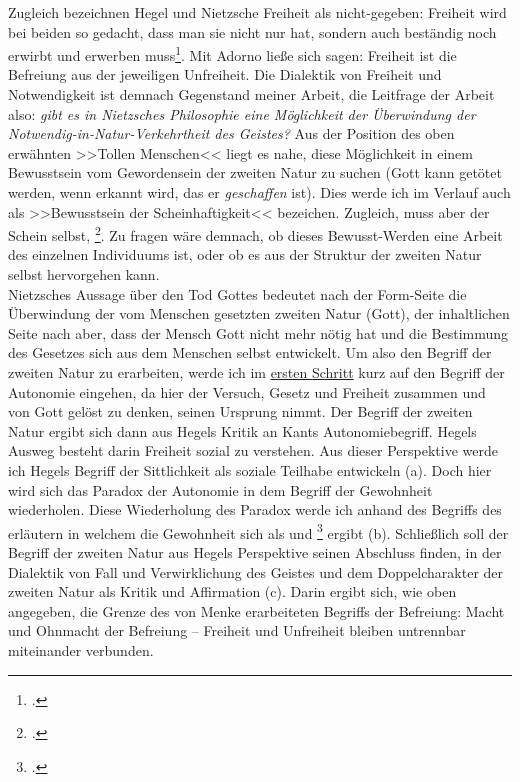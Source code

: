 \documentclass[12pt, a4paper, openany]{report}
\begin{document}
Zugleich bezeichnen Hegel und Nietzsche Freiheit als nicht-gegeben: 
Freiheit wird bei beiden so gedacht, dass man sie \glqq nicht nur hat, sondern auch beständig  noch erwirbt und erwerben muss\grqq\footcite[][636]{nietzsche_morgenrote_1999}. 
Mit Adorno ließe sich sagen: Freiheit ist die Befreiung aus der jeweiligen Unfreiheit.
Die Dialektik von Freiheit und Notwendigkeit ist demnach Gegenstand meiner Arbeit, 
die Leitfrage der Arbeit also: \textit{gibt es in Nietzsches Philosophie eine Möglichkeit der Überwindung der Notwendig-in-Natur-Verkehrtheit des Geistes?}
Aus der Position des oben erwähnten >>Tollen Menschen<< liegt es nahe, diese Möglichkeit in einem Bewusstsein vom Gewordensein der zweiten Natur zu suchen (Gott kann getötet werden, wenn erkannt wird, das er \emph{geschaffen} ist). 
Dies werde ich im Verlauf auch als >>Bewusstsein der Scheinhaftigkeit<< bezeichen.
Zugleich, muss aber der Schein selbst, \footcite[][417.]{nietzsche_morgenrote_1999}.
Zu fragen wäre demnach, ob dieses Bewusst-Werden eine Arbeit des einzelnen Individuums ist, oder ob es aus der Struktur der zweiten Natur selbst hervorgehen kann.\\

Nietzsches Aussage über den Tod Gottes bedeutet nach der Form-Seite die Überwindung der vom Menschen gesetzten zweiten Natur (Gott), der inhaltlichen Seite nach aber, dass der Mensch Gott nicht mehr nötig hat und die Bestimmung des Gesetzes sich aus dem Menschen selbst entwickelt. 
Um also den Begriff der zweiten Natur zu erarbeiten, werde ich im \hyperref[abschnitt_1]{ersten Schritt} kurz auf den Begriff der Autonomie eingehen, da hier der Versuch, Gesetz und Freiheit zusammen und von Gott gelöst zu denken, seinen Ursprung nimmt. 
Der Begriff der zweiten Natur ergibt sich dann aus Hegels Kritik an Kants Autonomiebegriff.
Hegels Ausweg besteht darin Freiheit sozial zu verstehen.
Aus dieser Perspektive werde ich Hegels Begriff der Sittlichkeit als soziale Teilhabe entwickeln (a).
Doch hier wird sich das Paradox der Autonomie in dem Begriff der Gewohnheit wiederholen.
Diese Wiederholung des Paradox werde ich anhand des Begriffs des  erläutern in welchem die Gewohnheit sich als  und \footcite[Vgl.][145]{menke_autonomie_2018} ergibt (b).
Schließlich soll der Begriff der zweiten Natur aus Hegels Perspektive seinen Abschluss finden, in der Dialektik von Fall und Verwirklichung des Geistes und dem Doppelcharakter der zweiten Natur als Kritik und Affirmation (c).
Darin ergibt sich, wie oben angegeben, die Grenze des von Menke erarbeiteten Begriffs der Befreiung:
Macht und Ohnmacht der Befreiung -- Freiheit und Unfreiheit bleiben untrennbar miteinander verbunden.
\end{document}
